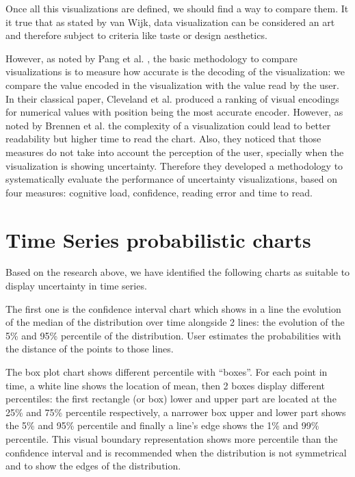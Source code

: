 \documentclass[a4paper,3p,sort&compress]{elsarticle}
\begin{document}
Once all this visualizations are defined, we should find a way to compare them. It it true that as stated by van Wijk,
data visualization can be considered an art and therefore subject to criteria like taste or design aesthetics.

However, as noted by Pang et al. \cite{pang_approaches_1997}, the basic methodology to compare visualizations is to measure how accurate is the 
decoding of the visualization: we compare the value encoded in the visualization with the value read
by the user. In their classical paper, Cleveland et al. \cite{cleveland_graphical_1984} produced a ranking of visual encodings for numerical values 
with position being the most accurate encoder. However, as noted by Brennen et al. \cite{brennen_instrument_2018}
the complexity of a visualization could lead to better readability but higher time to read the chart. Also, 
they noticed that those measures do not take into account the perception of the user, specially when the visualization
is showing uncertainty. Therefore they developed a methodology 
to systematically evaluate the performance of uncertainty visualizations, based on four measures: 
cognitive load, confidence, reading error and time to read. 

\section{Time Series probabilistic charts}  
\label{sec:time_series}

Based on the research above, we have identified the following charts as suitable to display 
uncertainty in time series.

The first one is the confidence interval chart  which shows in a line the evolution of the 
median of the distribution
 over time alongside 2 lines: the evolution of the 5\% and 95\% percentile of the distribution. 
 User estimates the probabilities with the distance of the points to those lines.

The box plot chart shows different percentile with “boxes”. For each point in time, a white 
line shows the location of mean, then 2 boxes display different percentiles: the
first rectangle (or box) lower and upper part are located 
at the 25\% and 75\% percentile respectively, a narrower box upper and lower part shows 
the 5\% and 95\% percentile and finally a line’s edge shows the 1\% and 99\% percentile. 
This visual boundary representation shows more percentile than the confidence interval and 
is recommended when the distribution is not symmetrical and to show the edges of the distribution.
\end{document}
